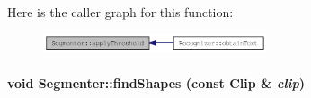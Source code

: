 Here is the caller graph for this function:\nopagebreak
\begin{figure}[H]
\begin{center}
\leavevmode
\includegraphics[width=186pt]{class_segmenter_6854315e3320f9d9a8ece14cbb8570ee_icgraph}
\end{center}
\end{figure}
\hypertarget{class_segmenter_465c8e755bb56d247add080a04377520}{
\paragraph[findShapes]{\setlength{\rightskip}{0pt plus 5cm}void Segmenter::findShapes (const {\bf Clip} \& {\em clip})}\hfill}
\label{class_segmenter_465c8e755bb56d247add080a04377520}


